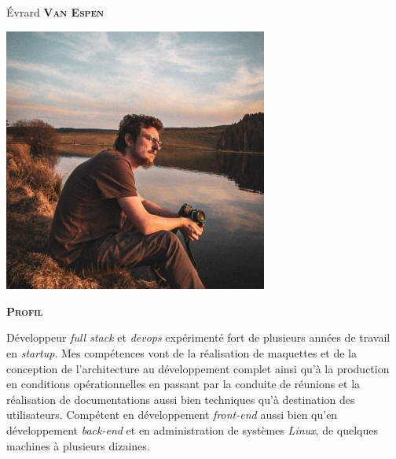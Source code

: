 \documentclass[10pt, a4paper]{article}
\newcommand{\headleft}[1]{\vspace*{3ex}\textsc{\textbf{#1}}\par%
    \vspace*{-1.5ex}\hrulefill\par\vspace*{0.7ex}}
\begin{document}
\setlength{\topskip}{0pt}
\setlength{\parindent}{0pt}
\setlength{\parskip}{0pt}
\setlength{\fboxsep}{0pt}
\pagestyle{empty}
\raggedbottom

\begin{minipage}[t]{0.33\textwidth} %

\vspace{-.2ex} %
\colorbox{accent!90}{\color{white}  %
\textwidth\relax%
\begin{minipage}[t][298mm][t]{0.88\textwidth}
\raggedright
\vspace*{2.5ex}

\Large Évrard \textbf{\textsc{Van Espen}} \normalsize 

\null\hfill\includegraphics[width=0.65\textwidth]{me.jpeg}\hfill\null

{\small\headleft{Profil}}
{\small
Développeur \textit{full stack} et \textit{devops} expérimenté fort de plusieurs années de travail en \textit{startup}. Mes compétences vont de la réalisation de maquettes et de la conception de l'architecture au développement complet ainsi qu'à la production en conditions opérationnelles en passant par la conduite de réunions et la réalisation de documentations aussi bien techniques qu'à destination des utilisateurs. Compétent en développement \textit{front-end} aussi bien qu'en développement \textit{back-end} et en administration de systèmes \textit{Linux}, de quelques machines à plusieurs dizaines.
}


\end{minipage}}
\end{minipage}
\end{document}
